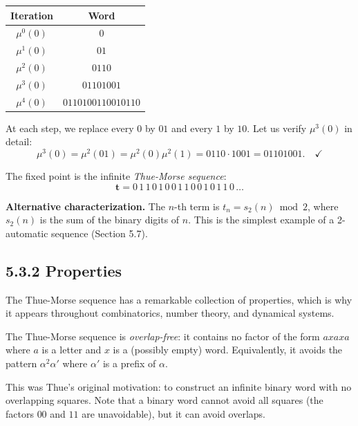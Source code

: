 \begin{example}

\begin{center}
\begin{tabular}{cc}
\toprule
Iteration & Word \\
\midrule
$\mu^0(0)$ & $0$ \\
$\mu^1(0)$ & $01$ \\
$\mu^2(0)$ & $0110$ \\
$\mu^3(0)$ & $01101001$ \\
$\mu^4(0)$ & $0110100110010110$ \\
\bottomrule
\end{tabular}
\end{center}

At each step, we replace every $0$ by $01$ and every $1$ by $10$. Let us verify $\mu^3(0)$ in detail:
\[\mu^3(0) = \mu^2(01) = \mu^2(0)\mu^2(1) = 0110 \cdot 1001 = 01101001. \quad\checkmark\]

The fixed point is the infinite \textit{Thue-Morse sequence}:
\[\mathbf{t} = 0\, 1\, 1\, 0\, 1\, 0\, 0\, 1\, 1\, 0\, 0\, 1\, 0\, 1\, 1\, 0\, \ldots\]

\textbf{Alternative characterization.} The $n$-th term is $t_n = s_2(n) \bmod 2$, where $s_2(n)$ is the sum of the binary digits of $n$. This is the simplest example of a 2-automatic sequence (Section 5.7).
\end{example}

\subsection{5.3.2 Properties}

The Thue-Morse sequence has a remarkable collection of properties, which is why it appears throughout combinatorics, number theory, and dynamical systems.

\begin{theorem}
The Thue-Morse sequence is \textit{overlap-free}: it contains no factor of the form $axaxa$ where $a$ is a letter and $x$ is a (possibly empty) word. Equivalently, it avoids the pattern $\alpha^2 \alpha'$ where $\alpha'$ is a prefix of $\alpha$.

This was Thue's original motivation: to construct an infinite binary word with no overlapping squares. Note that a binary word cannot avoid all squares (the factors $00$ and $11$ are unavoidable), but it can avoid overlaps.
\end{theorem}

